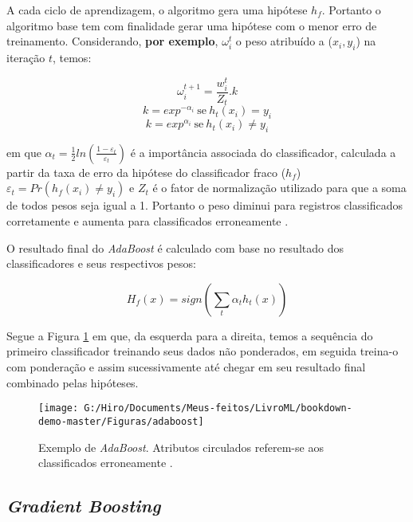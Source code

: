 \documentclass[
  openany]{book}
\begin{document}
A cada ciclo de aprendizagem, o algoritmo gera uma hipótese \(h_f\). Portanto o algoritmo base tem com finalidade gerar uma hipótese com o menor erro de treinamento. Considerando, \textbf{por exemplo}, \(\omega_i^{t}\) o peso atribuído a (\(x_i,y_i\)) na iteração \(t\), temos:

\begin{equation}
    \omega_i^{t+1}=\frac{w_i^{t}}{Z_t}.k 
    \label{eq:pesoadaboost}
\end{equation}
\[k=exp^{-\alpha_i} \ \mbox{se} \ h_t(x_i)=y_i\]
\[k=exp^{\alpha_i}\ \mbox{se} \ h_t(x_i)\neq y_i\]

em que \(\alpha_t=\frac{1}{2}ln(\frac{1-\varepsilon_t}{\varepsilon_t})\) é a importância associada do classificador, calculada a partir da taxa de erro da hipótese do classificador fraco (\(h_f\)) \(\varepsilon_t=Pr(h_f(x_i)\neq y_i)\) e \(Z_t\) é o fator de normalização utilizado para que a soma de todos pesos seja igual a 1. Portanto o peso diminui para registros classificados corretamente e aumenta para classificados erroneamente \citep{merjildo2013algoritmo, chaves2012estudo}.

O resultado final do \emph{AdaBoost} é calculado com base no resultado dos classificadores e seus respectivos pesos:

\begin{equation}
   H_f(x)=sign(\sum_t \alpha_t h_t(x)) 
    \label{eq:adaboost}
\end{equation}

Segue a Figura \ref{fig:adaboost} em que, da esquerda para a direita, temos a sequência do primeiro classificador treinando seus dados não ponderados, em seguida treina-o com ponderação e assim sucessivamente até chegar em seu resultado final combinado pelas hipóteses.

\begin{figure}

{\centering \texttt{[image: G:/Hiro/Documents/Meus-feitos/LivroML/bookdown-demo-master/Figuras/adaboost]} 

}

\caption{Exemplo de \emph{AdaBoost}. Atributos circulados referem-se aos classificados erroneamente \citep{marsh2016multivariate}.}\label{fig:adaboost}
\end{figure}



\hypertarget{gradientboost}{%
\subsection{\texorpdfstring{\emph{Gradient Boosting}}{Gradient Boosting}}\label{gradientboost}}
\end{document}
